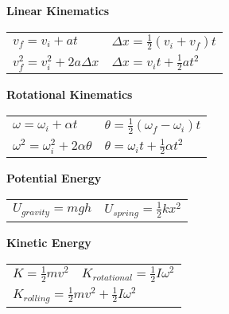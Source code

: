 \documentclass[12pt]{article}
\begin{document}
%
%
\begin{minipage}[t]{.5\textwidth}
\textbf{Linear Kinematics} \\[6pt]
	\begin{tabular}{p{3cm} p{6cm}}
	$v_f = v_i + at$ & \hspace{12pt} $\Delta x = \tfrac{1}{2}(v_i + v_f)t$\\[6pt]
	$v_f^2 = v_i^2 + 2a \Delta x$ & \hspace{12pt} $\Delta x = v_i t + \tfrac{1}{2} at^2$\\[12pt]
	\end{tabular}
%
%
\textbf{Rotational Kinematics} \\[6pt]
	\begin{tabular}{p{3cm} p{6cm}}
	$\omega = \omega_i +\alpha t$ & \hspace{12pt} $\theta = \tfrac{1}{2} (\omega_f - \omega_i) t$ \\[6pt]
	$\omega^2 = \omega_i^2 + 2\alpha \theta$ & \hspace{12pt} $\theta = \omega_i t + \tfrac{1}{2} \alpha t^2$ \\
	\end{tabular}
\end{minipage}
%
%
\begin{minipage}[t]{.5\textwidth}
\textbf{Potential Energy} \\[6pt]
	\begin{tabular}{p{3cm} p{6cm}}
	$U_{gravity} = mgh$ & $U_{spring} = \tfrac{1}{2} kx^2$ \\[12pt]
	\end{tabular}
%
%
\textbf{Kinetic Energy} \\[6pt]
	\begin{tabular}{p{3cm} p{6cm}}
	$K = \tfrac{1}{2}mv^2$ & $K_{rotational} = \tfrac{1}{2} I \omega^2$ \\[6pt]
	\multicolumn{2}{l}{	
	$K_{rolling} = \tfrac{1}{2}mv^2 + \tfrac{1}{2}I\omega^2$} \\[12pt]
	\end{tabular}
\end{minipage}
\vspace{12pt}
\end{document}
